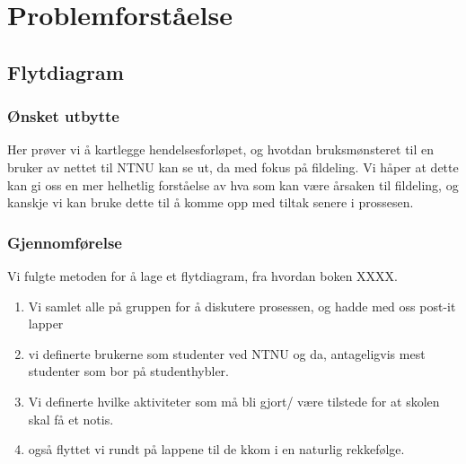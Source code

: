 \chapter{Problemforståelse}

\section{Flytdiagram}

\subsection{Ønsket utbytte}
Her prøver vi å kartlegge hendelsesforløpet, og hvotdan bruksmønsteret til en bruker av nettet til NTNU kan se ut, da med fokus på fildeling. Vi håper at dette kan gi oss en mer helhetlig forståelse av hva som kan være årsaken til fildeling, og kanskje vi kan bruke dette til å komme opp med tiltak senere i prossesen.
\subsection{Gjennomførelse}
Vi fulgte metoden for å lage et flytdiagram, fra hvordan boken XXXX.
\begin{enumerate}
    \item Vi samlet alle på gruppen for å diskutere prosessen, og hadde med oss post-it lapper
    \item vi definerte brukerne som studenter ved NTNU og da, antageligvis mest studenter som bor på studenthybler.
    \item Vi definerte hvilke aktiviteter som må bli gjort/ være tilstede for at skolen skal få et notis.
    \item også flyttet vi rundt på lappene til de kkom i en naturlig rekkefølge.
\end{enumerate}



